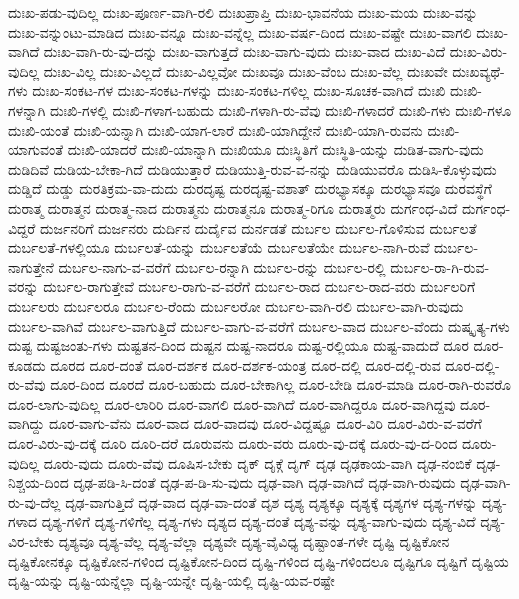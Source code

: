 {ದುಃಖ-ಪಡು-ವುದಿಲ್ಲ
ದುಃಖ-ಪೂರ್ಣ-ವಾಗಿ-ರಲಿ
ದುಃಖಪ್ರಾಪ್ತಿ
ದುಃಖ-ಭಾವನೆಯ
ದುಃಖ-ಮಯ
ದುಃಖ-ವನ್ನು
ದುಃಖ-ವನ್ನುಂಟು-ಮಾಡಿದ
ದುಃಖ-ವನ್ನೂ
ದುಃಖ-ವನ್ನೆಲ್ಲ
ದುಃಖ-ವರ್ಷ-ದಿಂದ
ದುಃಖ-ವಷ್ಟೇ
ದುಃಖ-ವಾಗಲಿ
ದುಃಖ-ವಾಗಿದೆ
ದುಃಖ-ವಾಗಿ-ರು-ವು-ದನ್ನು
ದುಃಖ-ವಾಗುತ್ತದೆ
ದುಃಖ-ವಾಗು-ವುದು
ದುಃಖ-ವಾದ
ದುಃಖ-ವಿದೆ
ದುಃಖ-ವಿರು-ವುದಿಲ್ಲ
ದುಃಖ-ವಿಲ್ಲ
ದುಃಖ-ವಿಲ್ಲದೆ
ದುಃಖ-ವಿಲ್ಲವೋ
ದುಃಖವೂ
ದುಃಖ-ವೆಂಬ
ದುಃಖ-ವೆಲ್ಲ
ದುಃಖವೇ
ದುಃಖವ್ಯಥೆ-ಗಳು
ದುಃಖ-ಸಂಕಟ-ಗಳ
ದುಃಖ-ಸಂಕಟ-ಗಳನ್ನು
ದುಃಖ-ಸಂಕಟ-ಗಳಿಲ್ಲ
ದುಃಖ-ಸೂಚಕ-ವಾಗಿದೆ
ದುಃಖಿ
ದುಃಖಿ-ಗಳನ್ನಾಗಿ
ದುಃಖಿ-ಗಳಲ್ಲಿ
ದುಃಖಿ-ಗಳಾಗ-ಬಹುದು
ದುಃಖಿ-ಗಳಾಗಿ-ರು-ವೆವು
ದುಃಖಿ-ಗಳಾದರೆ
ದುಃಖಿ-ಗಳು
ದುಃಖಿ-ಗಳೂ
ದುಃಖಿ-ಯಂತೆ
ದುಃಖಿ-ಯನ್ನಾಗಿ
ದುಃಖಿ-ಯಾಗ-ಲಾರೆ
ದುಃಖಿ-ಯಾಗಿದ್ದೇನೆ
ದುಃಖಿ-ಯಾಗಿ-ರುವನು
ದುಃಖಿ-ಯಾಗುವಂತೆ
ದುಃಖಿ-ಯಾದರೆ
ದುಃಖಿ-ಯಾನ್ನಾಗಿ
ದುಃಖಿಯೂ
ದುಃಸ್ಥಿತಿಗೆ
ದುಃಸ್ಥಿತಿ-ಯನ್ನು
ದುಡಿತ-ವಾಗು-ವುದು
ದುಡಿದಿವೆ
ದುಡಿಯ-ಬೇಕಾ-ಗಿದೆ
ದುಡಿಯುತ್ತಾರೆ
ದುಡಿಯುತ್ತಿ-ರುವ-ವ-ನನ್ನು
ದುಡಿಯುವರೊ
ದುಡಿಸಿ-ಕೊಳ್ಳುವುದು
ದುಡ್ಡಿದೆ
ದುಡ್ಡು
ದುರತಿಕ್ರಮ-ವಾ-ದುದು
ದುರದೃಷ್ಟ
ದುರದೃಷ್ಟ-ವಶಾತ್
ದುರಭ್ಯಾಸಕ್ಕೂ
ದುರಭ್ಯಾಸವೂ
ದುರವಸ್ಥೆಗೆ
ದುರಾತ್ಮ
ದುರಾತ್ಮನ
ದುರಾತ್ಮ-ನಾದ
ದುರಾತ್ಮನು
ದುರಾತ್ಮನೂ
ದುರಾತ್ಮ-ರಿಗೂ
ದುರಾತ್ಮರು
ದುರ್ಗಂಧ-ವಿದೆ
ದುರ್ಗಂಧ-ವಿದ್ದರೆ
ದುರ್ಜನರಿಗೆ
ದುರ್ಜನರು
ದುರ್ದಿನ
ದುರ್ದೈವ
ದುರ್ನಡತೆ
ದುರ್ಬಲ
ದುರ್ಬಲ-ಗೊಳಿಸುವ
ದುರ್ಬಲತೆ
ದುರ್ಬಲತೆ-ಗಳಲ್ಲಿಯೂ
ದುರ್ಬಲತೆ-ಯನ್ನು
ದುರ್ಬಲತೆಯೆ
ದುರ್ಬಲತೆಯೇ
ದುರ್ಬಲ-ನಾಗಿ-ರುವೆ
ದುರ್ಬಲ-ನಾಗುತ್ತೇನೆ
ದುರ್ಬಲ-ನಾಗು-ವ-ವರೆಗೆ
ದುರ್ಬಲ-ರನ್ನಾಗಿ
ದುರ್ಬಲ-ರನ್ನು
ದುರ್ಬಲ-ರಲ್ಲಿ
ದುರ್ಬಲ-ರಾ-ಗಿ-ರುವ-ವರನ್ನು
ದುರ್ಬಲ-ರಾಗುತ್ತೇವೆ
ದುರ್ಬಲ-ರಾಗು-ವ-ವರೆಗೆ
ದುರ್ಬಲ-ರಾದ
ದುರ್ಬಲ-ರಾದ-ವರು
ದುರ್ಬಲರಿಗೆ
ದುರ್ಬಲರು
ದುರ್ಬಲರೂ
ದುರ್ಬಲ-ರೆಂದು
ದುರ್ಬಲರೋ
ದುರ್ಬಲ-ವಾಗಿ-ರಲಿ
ದುರ್ಬಲ-ವಾಗಿ-ರುವುದು
ದುರ್ಬಲ-ವಾಗಿವೆ
ದುರ್ಬಲ-ವಾಗುತ್ತಿದೆ
ದುರ್ಬಲ-ವಾಗು-ವ-ವರೆಗೆ
ದುರ್ಬಲ-ವಾದ
ದುರ್ಬಲ-ವೆಂದು
ದುಷ್ಕೃತ್ಯ-ಗಳು
ದುಷ್ಟ
ದುಷ್ಟಜಂತು-ಗಳು
ದುಷ್ಟತನ-ದಿಂದ
ದುಷ್ಟನ
ದುಷ್ಟ-ನಾದರೂ
ದುಷ್ಟ-ರಲ್ಲಿಯೂ
ದುಷ್ಟ-ವಾದುದೆ
ದೂರ
ದೂರ-ಕೂಡದು
ದೂರದ
ದೂರ-ದಂತೆ
ದೂರ-ದರ್ಶಕ
ದೂರ-ದರ್ಶಕ-ಯಂತ್ರ
ದೂರ-ದಲ್ಲಿ
ದೂರ-ದಲ್ಲಿ-ರುವ
ದೂರ-ದಲ್ಲಿ-ರು-ವೆವು
ದೂರ-ದಿಂದ
ದೂರದೆ
ದೂರ-ಬಹುದು
ದೂರ-ಬೇಕಾಗಿಲ್ಲ
ದೂರ-ಬೇಡಿ
ದೂರ-ಮಾಡಿ
ದೂರ-ರಾಗಿ-ರುವರೊ
ದೂರ-ಲಾಗು-ವುದಿಲ್ಲ
ದೂರ-ಲಾರಿರಿ
ದೂರ-ವಾಗಲಿ
ದೂರ-ವಾಗಿದೆ
ದೂರ-ವಾಗಿದ್ದರೂ
ದೂರ-ವಾಗಿದ್ದವು
ದೂರ-ವಾಗಿದ್ದು
ದೂರ-ವಾಗು-ವೆನು
ದೂರ-ವಾದ
ದೂರ-ವಾದವು
ದೂರ-ವಿದ್ದಷ್ಟೂ
ದೂರ-ವಿರಿ
ದೂರ-ವಿರು-ವ-ವರೆಗೆ
ದೂರ-ವಿರು-ವು-ದಕ್ಕೆ
ದೂರಿ
ದೂರಿ-ದರೆ
ದೂರುವನು
ದೂರು-ವರು
ದೂರು-ವು-ದಕ್ಕೆ
ದೂರು-ವು-ದ-ರಿಂದ
ದೂರು-ವುದಿಲ್ಲ
ದೂರು-ವುದು
ದೂರು-ವೆವು
ದೂಷಿಸ-ಬೇಕು
ದೃಕ್
ದೃಕ್ಗೆ
ದೃಗ್
ದೃಢ
ದೃಢಕಾಯ-ವಾಗಿ
ದೃಢ-ನಂಬಿಕೆ
ದೃಢ-ನಿಶ್ಚಯ-ದಿಂದ
ದೃಢ-ಪಡಿ-ಸಿ-ದಂತೆ
ದೃಢ-ಪ-ಡಿ-ಸು-ವುದು
ದೃಢ-ವಾಗಿ
ದೃಢ-ವಾಗಿದೆ
ದೃಢ-ವಾಗಿ-ರುವುದು
ದೃಢ-ವಾಗಿ-ರು-ವು-ದೆಲ್ಲ
ದೃಢ-ವಾಗುತ್ತಿದೆ
ದೃಢ-ವಾದ
ದೃಢ-ವಾ-ದಂತೆ
ದೃಶ
ದೃಶ್ಯ
ದೃಶ್ಯಕ್ಕೂ
ದೃಶ್ಯಕ್ಕೆ
ದೃಶ್ಯಗಳ
ದೃಶ್ಯ-ಗಳನ್ನು
ದೃಶ್ಯ-ಗಳಾದ
ದೃಶ್ಯ-ಗಳಿಗೆ
ದೃಶ್ಯ-ಗಳಿಗೆಲ್ಲ
ದೃಶ್ಯ-ಗಳು
ದೃಶ್ಯದ
ದೃಶ್ಯ-ದಂತೆ
ದೃಶ್ಯ-ವನ್ನು
ದೃಶ್ಯ-ವಾಗು-ವುದು
ದೃಶ್ಯ-ವಿದೆ
ದೃಶ್ಯ-ವಿರ-ಬೇಕು
ದೃಶ್ಯವೂ
ದೃಶ್ಯ-ವೆಲ್ಲ
ದೃಶ್ಯ-ವೆಲ್ಲಾ
ದೃಶ್ಯವೇ
ದೃಶ್ಯ-ವೈವಿಧ್ಯ
ದೃಷ್ಟಾಂತ-ಗಳೇ
ದೃಷ್ಟಿ
ದೃಷ್ಟಿಕೋನ
ದೃಷ್ಟಿಕೋನಕ್ಕೂ
ದೃಷ್ಟಿಕೋನ-ಗಳಿಂದ
ದೃಷ್ಟಿಕೋನ-ದಿಂದ
ದೃಷ್ಟಿ-ಗಳಿಂದ
ದೃಷ್ಟಿ-ಗಳಿಂದಲೂ
ದೃಷ್ಟಿಗೂ
ದೃಷ್ಟಿಗೆ
ದೃಷ್ಟಿಯ
ದೃಷ್ಟಿ-ಯನ್ನು
ದೃಷ್ಟಿ-ಯನ್ನೆಲ್ಲಾ
ದೃಷ್ಟಿ-ಯನ್ನೇ
ದೃಷ್ಟಿ-ಯಲ್ಲಿ
ದೃಷ್ಟಿ-ಯವ-ರಷ್ಟೇ
}

